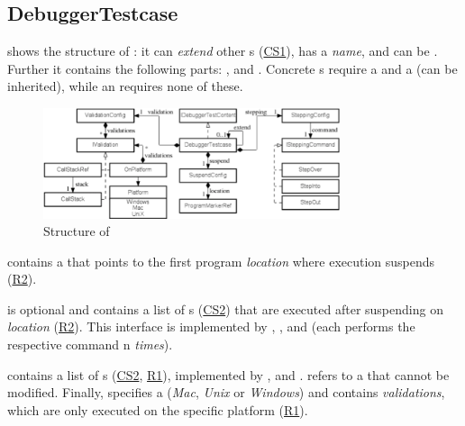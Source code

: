 \subsection{DebuggerTestcase}

 shows the structure of
:
it can \emph{extend} other s (\hyperref[CS1]{CS1}),
has a \emph{name}, and can be . Further it contains the following
parts: ,  and
. Concrete s require  
a  and a  (can be inherited),
while an   requires none of these.
 
\begin{figure}[h]
	\vspace{-3mm}
	\centering
    \includegraphics[width=8.7cm]{./figures/graph4_paper.png} 
    \vspace{-3mm}
	\caption{Structure of }
	\label{fig:DebuggerTestcaseStructure}
	\vspace{-2mm}
\end{figure}

 contains a  that points to the first
program \emph{location} where execution suspends (\hyperref[R2]{R2}). 

 is optional and contains a
list of s (\hyperref[CS2]{CS2}) that are executed after
suspending on \emph{location} (\hyperref[R2]{R2}). This interface is implemented by 
, , and  (each performs the
respective command n \emph{times}).

 contains a list of s
(\hyperref[CS2]{CS2}, \hyperref[R1]{R1}), implemented by
,  and .
 refers to a  that cannot
be modified. Finally,  specifies a 
(\emph{Mac}, \emph{Unix} or \emph{Windows}) and contains \emph{validations},
which are only executed on the specific platform (\hyperref[R1]{R1}).

